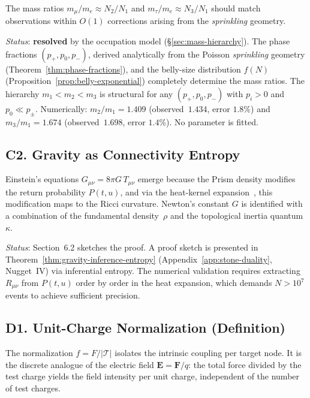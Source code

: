 The mass ratios $m_\mu/m_e \approx N_2/N_1$ and
$m_\tau/m_e \approx N_3/N_1$ should match
observations within $O(1)$ corrections arising from the
\emph{sprinkling} geometry.

\medskip\noindent
\textit{Status}: \textbf{resolved} by the occupation model
(\S\ref{sec:mass-hierarchy}). The phase fractions
$(p_+, p_0, p_-)$, derived analytically from the Poisson
\emph{sprinkling} geometry (Theorem~\ref{thm:phase-fractions}),
and the belly-size distribution $f(N)$
(Proposition~\ref{prop:belly-exponential}) completely determine
the mass ratios. The hierarchy $m_1 < m_2 < m_3$ is
structural for any $(p_+, p_0, p_-)$ with $p_i > 0$ and
$p_0 \ll p_\pm$. Numerically: $m_2/m_1 = 1{.}409$
(observed~$1{.}434$, error $1{.}8\%$) and $m_3/m_1 = 1{.}674$
(observed~$1{.}698$, error $1{.}4\%$). No parameter is fitted.

\subsection*{C2. Gravity as Connectivity Entropy}
\label{conj:gravity-entropy}

Einstein's equations $G_{\mu\nu} = 8\pi G\,T_{\mu\nu}$
emerge because the Prism density modifies the return
probability $P(t,u)$, and via the heat-kernel
expansion~\cite{minakshisundaram1949}, this modification maps to
the Ricci curvature. Newton's constant $G$ is identified
with a combination of the fundamental density~$\rho$ and the
topological inertia quantum~$\kappa$.

\medskip\noindent
\textit{Status}: Section~6.2 sketches the proof.
A proof sketch is presented in
Theorem~\ref{thm:gravity-inference-entropy}
(Appendix~\ref{app:stone-duality}, Nugget~IV) via
inferential entropy. The
numerical validation requires extracting $R_{\mu\nu}$ from $P(t,u)$
order by order in the heat expansion, which demands
$N > 10^7$ events to achieve sufficient precision.

\subsection*{D1. Unit-Charge Normalization (Definition)}
\label{def-ref:flux-normalization}

The normalization $f = F / |\mathcal{T}|$ isolates the intrinsic
coupling per target node. It is the discrete analogue of the
electric field $\mathbf{E} = \mathbf{F}/q$: the total force divided
by the test charge yields the field intensity per unit
charge, independent of the number of test charges.

